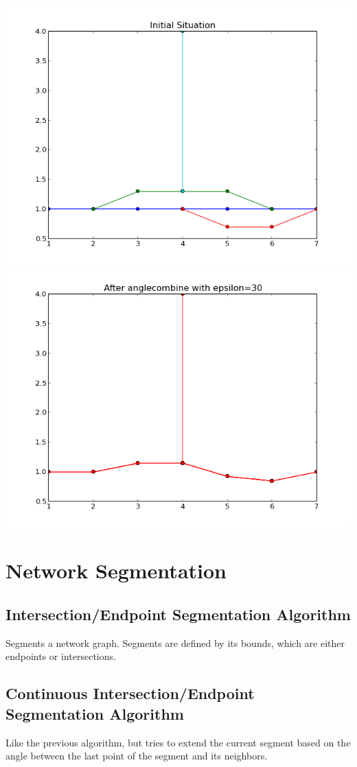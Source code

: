 \documentclass[twoside]{scrartcl}
\begin{document}
\includegraphics[scale=0.48]{comb-1.png}
\includegraphics[scale=0.48]{comb-2.png}

\section{Network Segmentation}
\subsection{Intersection/Endpoint Segmentation Algorithm}
Segments a network graph. Segments are defined by its bounds, which are
either endpoints or intersections.
\subsection{Continuous Intersection/Endpoint Segmentation Algorithm}
Like the previous algorithm, but tries to extend the current segment based
on the angle between the last point of the segment and its neighbors.
\newpage
\end{document}

